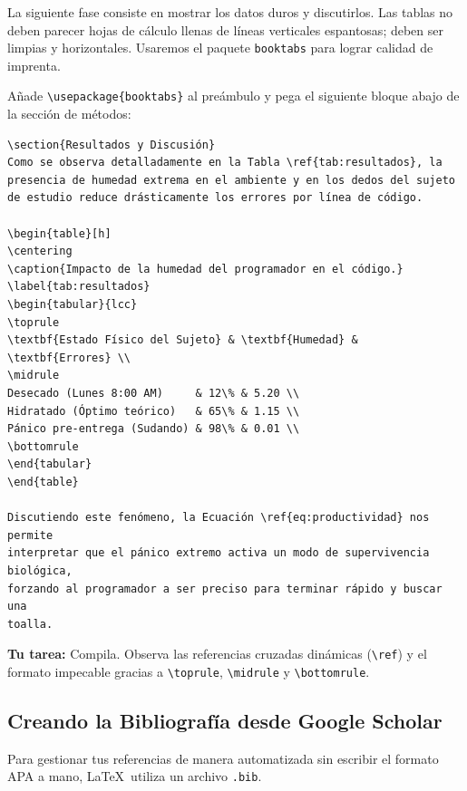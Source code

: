 La siguiente fase consiste en mostrar los datos duros y discutirlos. Las
tablas no deben parecer hojas de cálculo llenas de líneas verticales
espantosas; deben ser limpias y horizontales. Usaremos el paquete
\texttt{booktabs} para lograr calidad de imprenta.

Añade \verb|\usepackage{booktabs}| al preámbulo y pega el siguiente bloque
abajo de la sección de métodos:

\begin{verbatim}
\section{Resultados y Discusión}
Como se observa detalladamente en la Tabla \ref{tab:resultados}, la
presencia de humedad extrema en el ambiente y en los dedos del sujeto
de estudio reduce drásticamente los errores por línea de código. 

\begin{table}[h]
\centering
\caption{Impacto de la humedad del programador en el código.}
\label{tab:resultados}
\begin{tabular}{lcc}
\toprule
\textbf{Estado Físico del Sujeto} & \textbf{Humedad} & \textbf{Errores} \\
\midrule
Desecado (Lunes 8:00 AM)     & 12\% & 5.20 \\
Hidratado (Óptimo teórico)   & 65\% & 1.15 \\
Pánico pre-entrega (Sudando) & 98\% & 0.01 \\
\bottomrule
\end{tabular}
\end{table}

Discutiendo este fenómeno, la Ecuación \ref{eq:productividad} nos permite
interpretar que el pánico extremo activa un modo de supervivencia biológica,
forzando al programador a ser preciso para terminar rápido y buscar una
toalla.
\end{verbatim}

\textbf{Tu tarea:} Compila. Observa las referencias cruzadas dinámicas
(\verb|\ref|) y el formato impecable gracias a \verb|\toprule|,
\verb|\midrule| y \verb|\bottomrule|.

\subsection*{ Creando la Bibliografía desde Google Scholar}
\label{sub:paso4_bibliografia}

Para gestionar tus referencias de manera automatizada sin escribir el
formato APA a mano, \LaTeX\ utiliza un archivo \texttt{.bib}.

